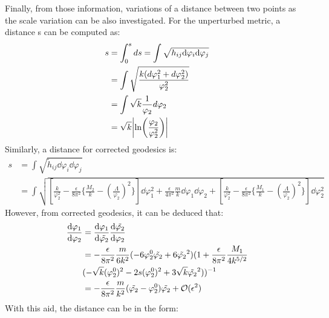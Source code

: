 Finally, from those information, variations of a distance between two points as the scale variation can be also investigated. For the unperturbed metric, a distance s can be computed as:
\begin{align}
    s &= \int _{0}^{s} ds = \int \sqrt{h_{ij} \dd \varphi_{i} \dd \varphi_{j}} \nonumber \\
    &= \int \sqrt{\frac{k(d\varphi_{1}^{2} + d\varphi_{2}^{2})}{\varphi_{2}^{2}}} \nonumber \\
    &= \int \sqrt{k}\frac{1}{\varphi_{2}}d\varphi_{2} \nonumber \\
    & = \sqrt{k} \abs{\ln(\frac{\varphi_{2}}{\varphi_{2}^{2}})}
\end{align}
Similarly, a distance for corrected geodesics is:
\begin{align}
    s &= \int \sqrt{\tilde h_{ij} \dd \varphi_{i} \dd \varphi_{j}} \nonumber \\
    &= \int \sqrt{[\frac{k}{\varphi_{2}^{2}} -\frac{\epsilon}{8\pi^{2}}\lbrace \frac{M_2}{k} - (\frac{\Lambda}{\varphi_{2}})^{2}\rbrace ]\dd \varphi_{1}^{2} + \frac{\epsilon}{4\pi^{2}} \frac{m}{k}\dd \varphi_{1} \dd \varphi_{2} +[\frac{k}{\varphi_{2}^{2}} -\frac{\epsilon}{8\pi^{2}}\lbrace \frac{M_1}{k} - (\frac{\Lambda}{\varphi_{2}})^{2}\rbrace ] \dd \varphi_{2}^{2} } \nonumber
\end{align}
However, from corrected geodesics, it can be deduced that:
\begin{align} 
    \begin{split}
    \dv{\varphi_{1}}{\varphi_{2}} &= \dv{\varphi_{1}}{\tilde{\varphi_{2}}}\dv{\tilde{\varphi_{2}}}{\varphi_{2}}  \\
    &= -\frac{\epsilon}{8\pi^{2}}\frac{m}{6k^{2}} (-6\varphi_{2}^{0} \tilde{\varphi_{2}} + 6 \tilde{\varphi_{2}}^{2})(1+\frac{\epsilon}{8\pi^{2}} \frac{M_{1}}{4k^{5/2}} \\
    & (-\sqrt{k}(\varphi_{2}^{0} )^{2} - 2s(\varphi_{2}^{0}) ^{2} + 3\sqrt{k} \tilde{\varphi_{2}}^{2}))^{-1}  \\
    &= -\frac{\epsilon}{8\pi^{2}}\frac{m}{k^{2}} (\tilde{\varphi_{2}} - \varphi_{2}^{0})\tilde{\varphi_{2}} + \mathcal{O}(\epsilon ^{2})
    \end{split}
\end{align}
With this aid, the distance can be in the form:
